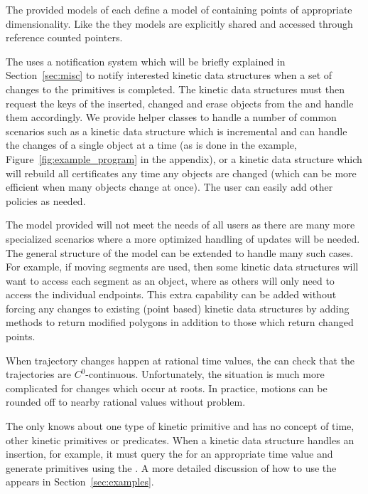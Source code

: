 The provided models of  each define a model of
 containing points of appropriate
dimensionality. Like the  they 
models are explicitly shared and accessed through reference counted
pointers.

The  uses a notification system which will be
briefly explained in Section~\ref{sec:misc} to notify interested
kinetic data structures when a set of changes to the primitives is
completed. The kinetic data structures must then request the keys of
the inserted, changed and erase objects from the
 and handle them accordingly. We provide helper
classes to handle a number of common scenarios such as a kinetic data
structure which is incremental and can handle the changes of a single
object at a time (as is done in the example,
Figure~\ref{fig:example_program} in the appendix), or a kinetic data
structure which will rebuild all certificates any time any objects are
changed (which can be more efficient when many objects change at
once). The user can easily add other policies as needed.

The  model provided will not meet the needs of
all users as there are many more specialized scenarios where a more
optimized handling of updates will be needed. The general structure of
the  model can be extended to handle many such
cases. For example, if moving segments are used, then some kinetic
data structures will want to access each segment as an object, where
as others will only need to access the individual endpoints. This extra
capability can be added without forcing any changes to existing (point
based) kinetic data structures by adding methods to return modified
polygons in addition to those which return changed points.

When trajectory changes happen at rational time values, the
 can check that the trajectories are
$C^0$-continuous. Unfortunately, the situation is much more
complicated for changes which occur at roots. In practice, motions can
be rounded off to nearby rational values without problem.

The  only knows about one type of kinetic
primitive and has no concept of time, other kinetic primitives or
predicates. When a kinetic data structure handles an insertion, for
example, it must query the  for an appropriate time
value and generate primitives using the . A more
detailed discussion of how to use the  appears
in Section~\ref{sec:examples}.

